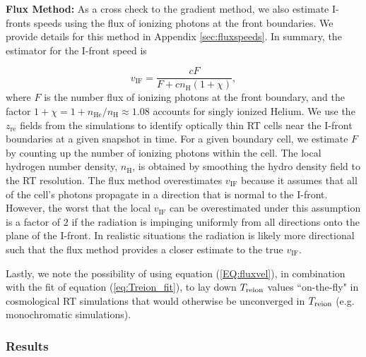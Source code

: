 \documentclass[twocolumn]{aastex62}
\newcommand{\zreion}{z_{\mathrm{re}}}
\newcommand{\Treion}{T_{\rm reion}}
\newcommand{\vIF}{v_{\mathrm{IF}}}
\begin{document}
\smallskip
\noindent
{\bf Flux Method:}  As a cross check to the gradient method, we also estimate I-fronts speeds using the flux of ionizing photons at the front boundaries.  We provide details for this method in Appendix \ref{sec:fluxspeeds}.  In summary, the estimator for the I-front speed is

\begin{equation}
\vIF = \frac{c F }{F+c  n_{\mathrm{H}}(1+\chi)},
\label{EQ:fluxvel}
\end{equation}
{where $F$ is the number flux of ionizing photons at the front boundary}, and the factor $1+\chi = 1 + n_{\mathrm{He}}/n_\mathrm{H} \approx 1.08$ accounts for singly ionized Helium.  We use the $\zreion$ fields from the simulations to identify optically thin RT cells near the I-front boundaries at a given snapshot in time.  For a given boundary cell, we estimate $F$ by counting up the number of ionizing photons within the cell.  The local hydrogen number density, $n_{\mathrm{H}}$, is obtained by smoothing the hydro density field to the RT resolution.  The flux method overestimates $\vIF$ because it assumes that all of the cell's photons propagate in a direction that is normal to the I-front.  However, the worst that the local $\vIF$ can be overestimated under this assumption is a factor of $2$ if the radiation is impinging uniformly from all directions onto the plane of the I-front.  In realistic situations the radiation is likely more directional such that the flux method provides a closer estimate to the true $\vIF$.  

Lastly, we note the possibility of using equation (\ref{EQ:fluxvel}), in combination with the fit of equation (\ref{eq:Treion_fit}), to lay down $\Treion$ values ``on-the-fly" in cosmological RT simulations that would otherwise be unconverged in $\Treion$ (e.g. monochromatic simulations).         

\subsubsection{Results}
\end{document}
